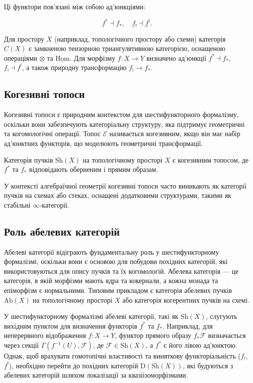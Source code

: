 \documentclass{article}
\begin{document}
Ці функтори пов’язані між собою ад’юнкціями:

\[
f^* \dashv f_*, \quad f_! \dashv f^!.
\]

\begin{definition}
Для простору \( X \) (наприклад, топологічного простору або схеми) категорія \( C(X) \) є замкненою тензорною триангулятивною категорією, оснащеною операціями \( \otimes \) та \( \underline{\mathrm{Hom}} \). Для морфізму \( f: X \to Y \) визначено ад’юнкції \( f^* \dashv f_* \), \( f_! \dashv f^! \), а також природну трансформацію \( f_! \to f_* \).
\end{definition}

\subsection{Когезивні топоси}

Когезивні топоси є природним контекстом для шестифункторного формалізму, оскільки вони забезпечують категоріальну структуру, яка підтримує геометричні та когомологічні операції. Топос \( \mathcal{E} \) називається когезивним, якщо він має набір ад’юнктних функторів, що моделюють геометричні трансформації.

\begin{example}
Категорія пучків \( \mathrm{Sh}(X) \) на топологічному просторі \( X \) є когезивним топосом, де \( f^* \) та \( f_* \) відповідають оберненим і прямим образам.
\end{example}

У контексті алгебраїчної геометрії когезивні топоси часто виникають як категорії пучків на схемах або стеках, оснащені додатковими структурами, такими як стабільні \(\infty\)-категорії.

\subsection{Роль абелевих категорій}

Абелеві категорії відіграють фундаментальну роль у шестифункторному формалізмі,
оскільки вони є основою для побудови похідних категорій, які використовуються
для опису пучків та їх когомологій. Абелева категорія — це категорія,
в якій морфізми мають ядра та кокернали, а кожна монада та епіморфізм є нормальними.
Типовим прикладом є категорія абелевих пучків \( \mathrm{Ab}(X) \) на
топологічному просторі \( X \) або категорія когерентних пучків на схемі.

У шестифункторному формалізмі абелеві категорії, такі як \( \mathrm{Sh}(X) \),
слугують вихідним пунктом для визначення функторів \( f^* \) та \( f_* \).
Наприклад, для неперервного відображення \( f: X \to Y \), функтор прямого
образу \( f_* \mathscr{F} \) визначається через секції \( \Gamma(f^{-1}(U), \mathscr{F}) \),
де \( \mathscr{F} \in \mathrm{Sh}(X) \), а \( f^* \) є його лівою ад’юнктою. Однак, щоб врахувати гомотопічні властивості та виняткову функторіальність (\( f_! \), \( f^! \)), необхідно перейти до похідних категорій \( \mathrm{D}(\mathrm{Sh}(X)) \), які будуються з абелевих категорій шляхом локалізації за квазіізоморфізмами.
\end{document}
